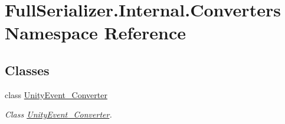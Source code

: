 \hypertarget{namespace_full_serializer_1_1_internal_1_1_converters}{}\section{Full\+Serializer.\+Internal.\+Converters Namespace Reference}
\label{namespace_full_serializer_1_1_internal_1_1_converters}
\subsection*{Classes}
\begin{DoxyCompactItemize}
\item 
class \hyperlink{class_full_serializer_1_1_internal_1_1_converters_1_1_unity_event___converter}{Unity\+Event\+\_\+\+Converter}
\begin{DoxyCompactList}\small\item\em Class \hyperlink{class_full_serializer_1_1_internal_1_1_converters_1_1_unity_event___converter}{Unity\+Event\+\_\+\+Converter}. \end{DoxyCompactList}\end{DoxyCompactItemize}
